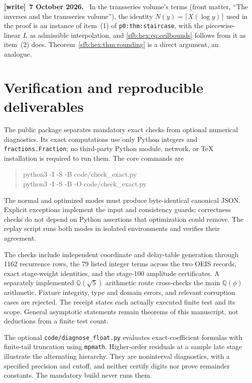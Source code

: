 \documentclass[11pt]{article}
\theoremstyle{remark}\newtheorem{remark}[theorem]{Remark}
\newcommand{\Q}{\mathbb Q}
\newcommand{\file}[1]{\nolinkurl{#1}}
\newenvironment{writenote}[1][]{\par\smallskip\begingroup\small
 \noindent\textbf{[write]}\if\relax\detokenize{#1}\relax\else~\textbf{#1.}\fi\ }%
 {\par\endgroup\smallskip}
\begin{document}
\begin{writenote}[7 October 2026]
In the transseries volume's terms (front matter, ``The inverses and the transseries volume''), the identity $N(y)=\lceil X(\log y)\rceil$ used in the proof is an instance of item~(1) of \file{p0:thm:staircase}, with the piecewise-linear $L$ as admissible interpolation, and \eqref{sfb:hex:eq:ceilbounds} follows from it as item~(2) does. Theorem~\ref{sfb:hex:thm:rounding} is a direct argument, an analogue.
\end{writenote}

\section{Verification and reproducible deliverables}\label{sfb:hex:sec:verification}
The public package separates mandatory exact checks from optional numerical diagnostics. Its exact computations use only Python integers and \texttt{fractions.Fraction}; no third-party Python module, network, or TeX installation is required to run them. The core commands are
\begin{quote}\ttfamily\small
python3 -I -S -B code/check\_exact.py\\
python3 -I -S -B -O code/check\_exact.py
\end{quote}
The normal and optimized modes must produce byte-identical canonical JSON. Explicit exceptions implement the input and consistency guards; correctness checks do not depend on Python assertions that optimization could remove. The replay script runs both modes in isolated environments and verifies their agreement.

The checks include independent coordinate and delay-table generation through 1162 recurrence rows, the 79 listed integer terms across the two OEIS records, exact stage-weight identities, and the stage-100 amplitude certificates. A separately implemented $\Q(\sqrt5)$ arithmetic route cross-checks the main $\Q(\phi)$ arithmetic. Fixture integrity, type and domain errors, and relevant corruption cases are rejected. The receipt states each actually executed finite test and its scope. General asymptotic statements remain theorems of this manuscript, not deductions from a finite test count.

The optional \texttt{code/diagnose\_float.py} evaluates exact-coefficient formulas with finite-tail truncation using \texttt{mpmath}. Higher-order residuals at a sample late stage illustrate the alternating hierarchy. They are noninterval diagnostics, with a specified precision and cutoff, and neither certify digits nor prove remainder constants. The mandatory build never runs them.
\end{document}
